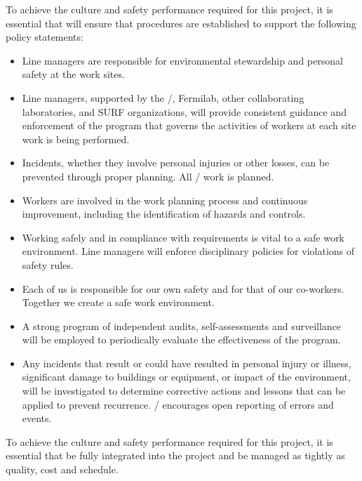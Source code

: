 To achieve the culture and safety performance required for this
project, it is essential that  will ensure that procedures
are established to support the following  policy
statements:
\begin{itemize}
  \item Line managers are responsible for environmental stewardship
    and personal safety at the  work sites.
  \item Line managers, supported by the /,
    Fermilab, other collaborating laboratories, and SURF 
    organizations, will provide consistent guidance and enforcement of
    the  program that governs the activities of workers at each
    site work is being performed.
  \item Incidents, whether they involve personal injuries or other
    losses, can be prevented through proper planning. All
    / work is planned.
  \item Workers are involved in the work planning process and
    continuous improvement, including the identification of hazards
    and controls.
  \item Working safely and in compliance with requirements is vital to
    a safe work environment. Line managers will enforce disciplinary
    policies for violations of safety rules.
  \item Each of us is responsible for  our own safety and for that of
    our co-workers. Together we create a safe work environment.
  \item A strong program of independent audits, self-assessments and
    surveillance will be employed to periodically evaluate the
    effectiveness of the  program.
  \item Any incidents that result or could have resulted in personal
    injury or illness, significant damage to buildings or equipment,
    or impact of the environment, will be investigated to determine
    corrective actions and lessons that can be applied to prevent
    recurrence. / encourages open reporting of
    errors and events.
\end{itemize}

To achieve the culture and safety performance required for this
project, it is essential that  be fully integrated into the
project and be managed as tightly as quality, cost and schedule.
